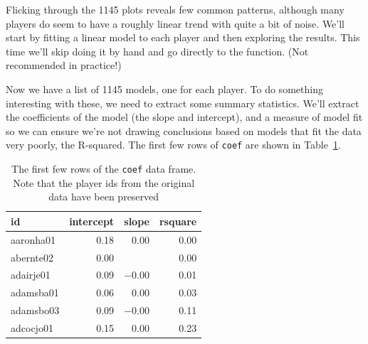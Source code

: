 \documentclass{scrartcl}
\begin{document}
% 


% 
% 


Flicking through the 1145 plots reveals few common patterns, although many players do seem to have a roughly linear trend with quite a bit of noise.  We'll start by fitting a linear model to each player and then exploring the results.  This time we'll skip doing it by hand and go directly to the function. (Not recommended in practice!)

% 


Now we have a list of 1145 models, one for each player.  To do something interesting with these, we need to extract some summary statistics.  We'll extract the coefficients of the model (the slope and intercept), and a measure of model fit so we can ensure we're not drawing conclusions based on models that fit the data very poorly, the R-squared.  The first few rows of {\tt coef} are shown in Table~\ref{tbl:coef}.

% 


\begin{table}[ht]
  \centering
  \begin{tabular}{lrrr}
    \hline
    id & intercept & slope & rsquare \\
    \hline
    aaronha01 & 0.18 & 0.00 & 0.00 \\
    abernte02 & 0.00 &  & 0.00 \\
    adairje01 & 0.09 & $-$0.00 & 0.01 \\
    adamsba01 & 0.06 & 0.00 & 0.03 \\
    adamsbo03 & 0.09 & $-$0.00 & 0.11 \\
    adcocjo01 & 0.15 & 0.00 & 0.23 \\
    \hline
  \end{tabular}
  \caption{The first few rows of the {\tt coef} data frame.  Note that the player ids from the original data have been preserved}
  \label{tbl:coef}
\end{table}
\end{document}
